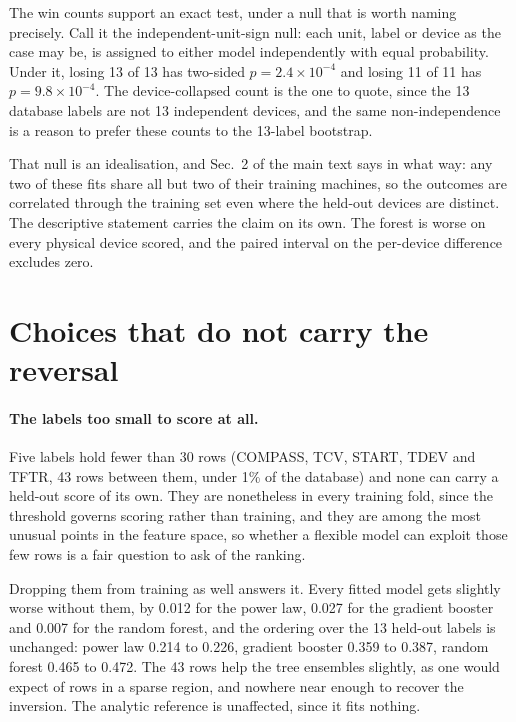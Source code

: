 \documentclass[12pt,letterpaper]{article}
\begin{document}
The win counts support an exact test, under a null that is worth naming
precisely. Call it the independent-unit-sign null: each unit, label or device
as the case may be, is assigned to either model independently with equal
probability. Under it, losing 13 of 13 has
two-sided $p=2.4\times10^{-4}$ and losing 11 of 11 has $p=9.8\times10^{-4}$. The
device-collapsed count is the one to quote, since the 13 database labels are not
13 independent devices, and the same non-independence is a reason to prefer
these counts to the 13-label bootstrap.

That null is an idealisation, and Sec.~2 of the main text says in what way: any two
of these fits share all but two of their training machines, so the outcomes are
correlated through the training set even where the held-out devices are
distinct. The descriptive statement carries the claim on its own. The forest is
worse on every physical device scored, and the paired interval on the per-device
difference excludes zero.

\section{Choices that do not carry the reversal}
\label{supp:choices}

\paragraph{The labels too small to score at all.} Five labels hold fewer than
30 rows (COMPASS, TCV, START, TDEV and TFTR, 43 rows between them, under 1\% of
the database) and none can carry a held-out score of its own. They are
nonetheless in every training fold, since the threshold governs scoring rather
than training, and they are among the most unusual points in the feature space,
so whether a flexible model can exploit those few rows is a fair question to ask
of the ranking.

Dropping them from training as well answers it. Every fitted model gets slightly
worse without them, by 0.012 for the power law, 0.027 for the gradient booster
and 0.007 for the random forest, and the ordering over the 13 held-out labels is
unchanged: power law 0.214 to 0.226, gradient booster 0.359 to 0.387, random
forest 0.465 to 0.472. The 43 rows help the tree ensembles slightly, as one
would expect of rows in a sparse region, and nowhere near enough to recover the
inversion. The analytic reference is unaffected, since it fits nothing.
\end{document}
